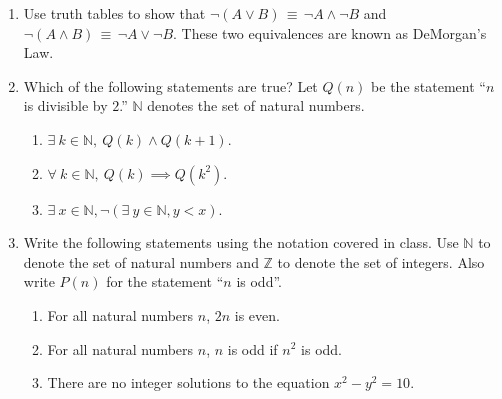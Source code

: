 \documentclass[11pt]{article}
\begin{document}
\maketitle

\begin{enumerate}

\item Use truth tables to show that $\neg (A\vee B) \,\equiv\, \neg A
\wedge \neg B$ and $\neg (A\wedge B) \,\equiv\, \neg A \vee \neg
B$. These two equivalences are known as DeMorgan's Law.


\begin{table}[h!]
\center
{}
\end{table}

\item Which of the following statements are true? Let $Q(n)$
  be the statement ``$n$ is divisible by $2$.''  $\mathbb{N}$ denotes the
  set of natural numbers.
  \begin{enumerate}
    \item $\exists \ k\in \mathbb{N}, \ Q(k) \wedge Q(k+1)$.
    \item $\forall \ k\in \mathbb{N}, \ Q(k)\implies Q(k^2)$.
    \item $\exists \ x\in \mathbb{N}, \neg(\exists \ y\in \mathbb{N}, y < x)$.
  \end{enumerate}

{\color{blue}{(a) false, (b) true, (c) true}}

\item Write the following statements using the notation covered in class. Use $\mathbb{N}$ to denote the set of natural numbers and $\mathbb{Z}$ to denote the
set of integers.  Also write $P(n)$ for the statement ``$n$ is odd''.
\begin{enumerate}
\item For all natural numbers $n$, $2n$ is even. \\
{}
\item For all natural numbers $n$, $n$ is odd if $n^2$ is odd. \\
{}
\item There are no integer solutions to the equation $x^2 - y^2 = 10$. \\
{}
\end{enumerate}




\end{enumerate}
\end{document}
